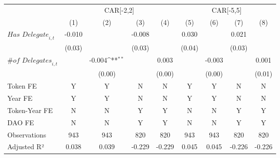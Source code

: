 {
\def\sym#1{\ifmmode^{#1}\else\(^{#1}\)\fi}
\begin{tabular}{l*{8}{c}}
\toprule
                    &\multicolumn{4}{c}{CAR[-2,2]}                                                          &\multicolumn{4}{c}{CAR[-5,5]}                                                          \\\cmidrule(lr){2-5}\cmidrule(lr){6-9}
                    &\multicolumn{1}{c}{(1)}         &\multicolumn{1}{c}{(2)}         &\multicolumn{1}{c}{(3)}         &\multicolumn{1}{c}{(4)}         &\multicolumn{1}{c}{(5)}         &\multicolumn{1}{c}{(6)}         &\multicolumn{1}{c}{(7)}         &\multicolumn{1}{c}{(8)}         \\
\midrule
$\textit{Has Delegate}_{i,t}$&      -0.010         &                     &      -0.008         &                     &       0.030         &                     &       0.021         &                     \\
                    &      (0.03)         &                     &      (0.03)         &                     &      (0.04)         &                     &      (0.03)         &                     \\
$\textit{\# of Delegates}_{i,t}$&                     &      -0.004\sym{**} &                     &       0.003         &                     &      -0.003         &                     &       0.001         \\
                    &                     &      (0.00)         &                     &      (0.00)         &                     &      (0.00)         &                     &      (0.01)         \\
\midrule
Token FE            &           Y         &           Y         &           N         &           N         &           Y         &           Y         &           N         &           N         \\
Year FE             &           Y         &           Y         &           N         &           N         &           Y         &           Y         &           N         &           N         \\
Token-Year FE       &           N         &           N         &           Y         &           Y         &           N         &           N         &           Y         &           Y         \\
DAO FE              &           N         &           N         &           Y         &           Y         &           N         &           N         &           Y         &           Y         \\
Observations        &         943         &         943         &         820         &         820         &         943         &         943         &         820         &         820         \\
Adjusted R²         &       0.038         &       0.039         &      -0.229         &      -0.229         &       0.045         &       0.045         &      -0.226         &      -0.226         \\
\bottomrule
\end{tabular}
}
